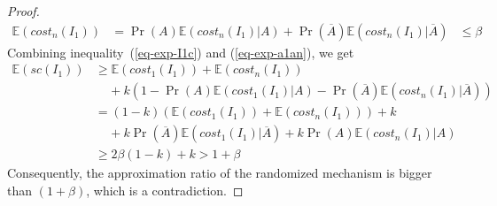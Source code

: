 \documentclass[twoside,11pt]{article}
\begin{document}
\begin{proof}
\begin{equation}
\begin{array}{lll}
\mathbb{E}(cost_n(I_1)) &=
\Pr(A)\mathbb{E}(cost_n(I_1)|A)
+ \Pr(\overline{A})\mathbb{E}(cost_n(I_1)|\overline{A})
&\le  \beta
\end{array}
\end{equation}
\noindent %
Combining inequality~(\ref{eq-exp-I1c}) and (\ref{eq-exp-a1an}),  we get
\begin{equation}
\begin{array}{ll}
\mathbb{E}(sc(I_1))
&\ge
\mathbb{E}(cost_1(I_1))
+ \mathbb{E}(cost_n(I_1)) \\
&~~~~~
+ k ( 1 - \Pr(A)\mathbb{E}(cost_1(I_1)|A) -  \Pr(\overline{A})\mathbb{E}(cost_n(I_1)|\overline{A}) )
\\
&=
(1-k)( \mathbb{E}(cost_1(I_1))
+ \mathbb{E}(cost_n(I_1)) )
+ k \\
&~~~~~+ k\Pr(\overline{A})\mathbb{E}(cost_1(I_1)|\overline{A}) + k \Pr(A)\mathbb{E}(cost_n(I_1)|A)
\\
& \ge 2\beta(1-k) + k > 1 + \beta
\end{array}
\end{equation}
Consequently, the approximation ratio of the randomized mechanism is bigger than $(1+\beta)$, which is a contradiction.
\end{proof}
%
%
%
\end{document}
